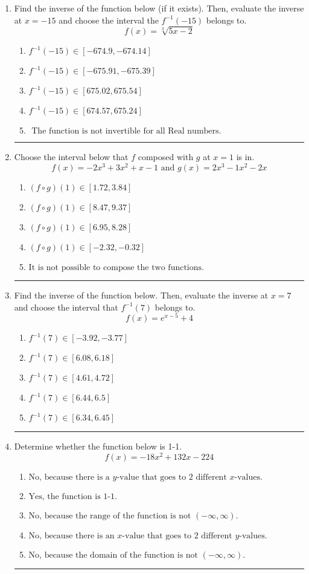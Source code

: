 \documentclass[14pt]{extbook}
\newcommand{\litem}[1]{\item#1\hspace*{-1cm}\rule{\textwidth}{0.4pt}}
\begin{document}
\begin{enumerate}
\litem{
Find the inverse of the function below (if it exists). Then, evaluate the inverse at $x = -15$ and choose the interval the $f^{-1}(-15)$ belongs to.\[ f(x) = \sqrt[3]{5 x - 2} \]\begin{enumerate}[label=\Alph*.]
\item \( f^{-1}(-15) \in [-674.9, -674.14] \)
\item \( f^{-1}(-15) \in [-675.91, -675.39] \)
\item \( f^{-1}(-15) \in [675.02, 675.54] \)
\item \( f^{-1}(-15) \in [674.57, 675.24] \)
\item \( \text{ The function is not invertible for all Real numbers. } \)

\end{enumerate} }
\litem{
Choose the interval below that $f$ composed with $g$ at $x=1$ is in.\[ f(x) = -2x^{3} +3 x^{2} +x -1 \text{ and } g(x) = 2x^{3} -1 x^{2} -2 x \]\begin{enumerate}[label=\Alph*.]
\item \( (f \circ g)(1) \in [1.72, 3.84] \)
\item \( (f \circ g)(1) \in [8.47, 9.37] \)
\item \( (f \circ g)(1) \in [6.95, 8.28] \)
\item \( (f \circ g)(1) \in [-2.32, -0.32] \)
\item \( \text{It is not possible to compose the two functions.} \)

\end{enumerate} }
\litem{
Find the inverse of the function below. Then, evaluate the inverse at $x = 7$ and choose the interval that $f^{-1}(7)$ belongs to.\[ f(x) = e^{x-5}+4 \]\begin{enumerate}[label=\Alph*.]
\item \( f^{-1}(7) \in [-3.92, -3.77] \)
\item \( f^{-1}(7) \in [6.08, 6.18] \)
\item \( f^{-1}(7) \in [4.61, 4.72] \)
\item \( f^{-1}(7) \in [6.44, 6.5] \)
\item \( f^{-1}(7) \in [6.34, 6.45] \)

\end{enumerate} }
\litem{
Determine whether the function below is 1-1.\[ f(x) = -18 x^2 + 132 x - 224 \]\begin{enumerate}[label=\Alph*.]
\item \( \text{No, because there is a $y$-value that goes to 2 different $x$-values.} \)
\item \( \text{Yes, the function is 1-1.} \)
\item \( \text{No, because the range of the function is not $(-\infty, \infty)$.} \)
\item \( \text{No, because there is an $x$-value that goes to 2 different $y$-values.} \)
\item \( \text{No, because the domain of the function is not $(-\infty, \infty)$.} \)


\end{enumerate}}
\end{enumerate}
\end{document}
